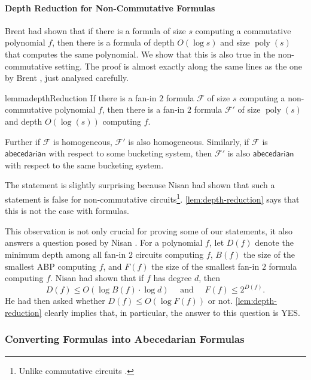 \documentclass[10pt,a4paper]{article}
\def\poly{\operatorname{poly}}
\newcommand{\form}{\textbf{$\mathcal{F}$}}
\newcommand{\abcd}{\mathsf{abecedarian}}
\begin{document}
\paragraph*{Depth Reduction for Non-Commutative Formulas}

Brent \cite{B74} had shown that if there is a formula of size $s$ computing a commutative polynomial $f$, then there is a formula of depth $O(\log s)$ and size $\poly(s)$ that computes the same polynomial. 
We show that this is also true in the non-commutative setting.
The proof is almost exactly along the same lines as the one by Brent \cite{B74}, just analysed carefully.

\begin{restatable}{lemma}{depthReduction}\label{lem:depth-reduction}
	If there is a fan-in $2$ formula $\form$ of size $s$ computing a non-commutative polynomial $f$, then there is a fan-in $2$ formula $\form'$ of size $\poly(s)$ and depth $O(\log(s))$ computing $f$.

	Further if $\form$ is homogeneous, $\form'$ is also homogeneous. Similarly, if $\form$ is $\abcd$ with respect to some bucketing system, then $\form'$ is also $\abcd$ with respect to the same bucketing system.
\end{restatable}

The statement is slightly surprising because Nisan \cite{N91} had shown that such a statement is false for non-commutative circuits\footnote{Unlike commutative circuits \cite{VSBR83}.}.
%
%
\autoref{lem:depth-reduction} says that this is not the case with formulas.

This observation is not only crucial for proving some of our statements, it also answers a question posed by Nisan \cite{N91}.
For a polynomial $f$, let $D(f)$ denote the minimum depth among all fan-in $2$ circuits computing $f$, $B(f)$ the size of the smallest ABP computing $f$, and $F(f)$ the size of the smallest fan-in $2$ formula computing $f$. 
Nisan \cite{N91} had shown that if $f$ has degree $d$, then
\[
	D(f) \leq O(\log B(f) \cdot \log d) \quad \text{ and } \quad F(f) \leq 2^{D(f)}.
\]
He had then asked whether $D(f) \leq O(\log F(f))$ or not. 
\autoref{lem:depth-reduction} clearly implies that, in particular, the answer to this question is YES.

\subsubsection*{Converting Formulas into Abecedarian Formulas}
\end{document}

